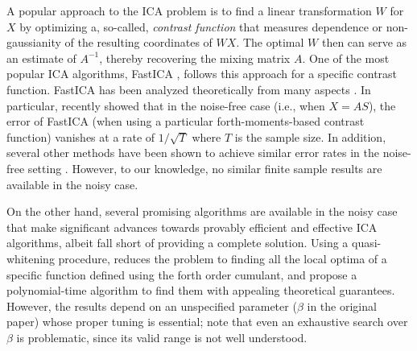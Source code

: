 \documentclass{article}
\theoremstyle{definition}
\begin{document}
A popular approach to the ICA problem is to find a linear transformation $W$ for $X$ by optimizing a, so-called, \emph{contrast function} 
that measures dependence or non-gaussianity of the resulting coordinates of $WX$.
The optimal $W$ then can serve as an estimate of $A^{-1}$, thereby recovering the mixing matrix $A$.
One of the most popular ICA algorithms, FastICA \citep{hyvarinen1999fast},
follows this approach for a specific contrast function.  
FastICA has been analyzed theoretically from many aspects \citep{tichavsky2006performance,oja2006fastica,ollila2010deflation,dermoune2013fastica,wei2014convergence}.
In particular, recently \citet{miettinen2014fourth} showed  that in the noise-free case (i.e., when $X = AS$), the error of FastICA (when using a particular forth-moments-based contrast function) vanishes at a rate of $1/\sqrt{T}$ where $T$ is the sample size.
In addition, several other methods have been shown to achieve similar error rates in the noise-free setting \citep[e.g.,][]{eriksson2003characteristic,samarov2004nonparametric,chen2005consistent,chen2006efficient}.
However, to our knowledge, no similar finite sample results are available in the noisy case.

On the other hand, several promising algorithms are available in the noisy case that make significant advances towards provably efficient and effective ICA algorithms, albeit fall short of providing a complete solution. 
Using a quasi-whitening procedure, \citet{arora2012provable} reduces the problem to finding all the local optima of a specific function defined using the forth order cumulant, 
and propose a polynomial-time algorithm to find them with appealing theoretical guarantees. However, the results depend on an unspecified parameter ($\beta$ in the original paper) whose proper tuning is essential; note that even an exhaustive search over $\beta$ is problematic, since its valid range is not well understood.
\end{document}
